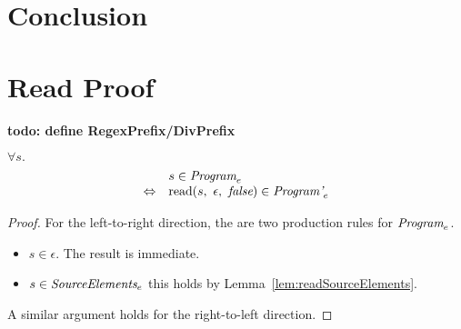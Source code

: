 \documentclass[preprint,10pt]{sigplanconf}
\begin{document}
\section{Conclusion}




\appendix

\clearpage

\section{Read Proof}

\textbf{todo: define RegexPrefix/DivPrefix}



\begin{theorem}\mbox{}

  \( \forall s. \)
  \[
  \begin{array}{rl}
  &s \in \textit{Program}_{e} \\
  \Leftrightarrow&
  \textrm{read}(s,~\epsilon,~\textit{false}) \in \textit{Program'}_{e}
  \end{array}
  \]
\end{theorem}
\begin{proof}

  For the left-to-right direction, the are two production rules for 
  \( \textit{Program}_{e} \).
  \begin{itemize}
  \item \( s \in \epsilon \). The result is immediate.

  \item \( s \in \textit{SourceElements}_{e} \)
    this holds by Lemma~\ref{lem:readSourceElements}.
  \end{itemize}

  A similar argument holds for the right-to-left direction.
\end{proof}
\end{document}
